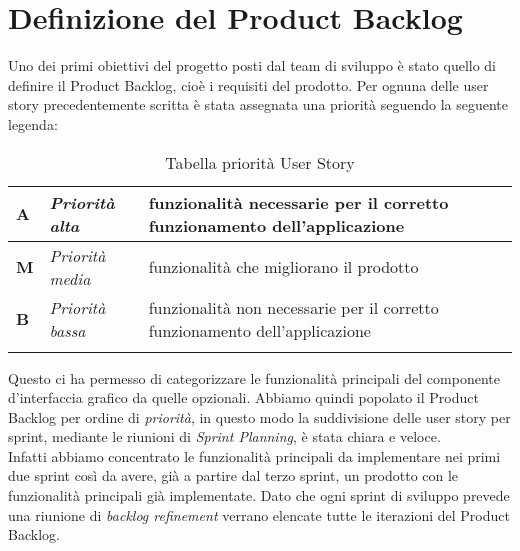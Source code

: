 \section{Definizione del Product Backlog}
Uno dei primi obiettivi del progetto posti dal team di sviluppo è stato quello di definire il Product Backlog, cioè i requisiti del prodotto. Per ognuna delle user story precedentemente scritta è stata assegnata una priorità seguendo la seguente legenda:
\begin{longtable} {
		|>{\centering}p{10mm}| 
		|>{}p{25mm}|
		|>{}p{85mm}|
		>{}p{0mm}}
	\hline
	\textbf{A} & \textit{Priorità alta}  & funzionalità necessarie per il corretto funzionamento dell'applicazione \\ \hline
	\textbf{M} & \textit{Priorità media} & funzionalità che migliorano il prodotto \\ \hline
	\textbf{B} & \textit{Priorità bassa} & funzionalità non necessarie per il corretto funzionamento dell'applicazione \\ \hline
	\hline
	\caption{Tabella priorità User Story}
\end{longtable}
\noindent
Questo ci ha permesso di categorizzare le funzionalità principali del componente d'interfaccia grafico da quelle opzionali. Abbiamo quindi popolato il Product Backlog per ordine di \textit{priorità}, in questo modo la suddivisione delle user story per sprint, mediante le riunioni di \textit{Sprint Planning}, è stata chiara e veloce. \\
Infatti abbiamo concentrato le funzionalità principali da implementare nei primi due sprint così da avere, già a partire dal terzo sprint, un prodotto con le funzionalità principali già implementate. Dato che ogni sprint di sviluppo prevede una riunione di \emph{backlog refinement} verrano elencate tutte le iterazioni del Product Backlog.

